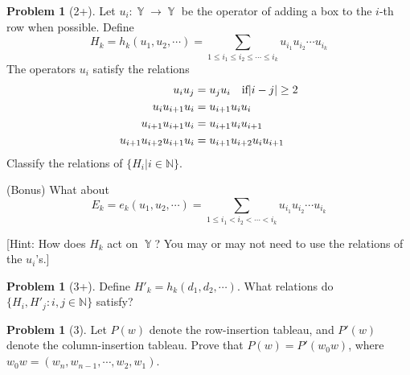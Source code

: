 \documentclass{amsart}
\theoremstyle{plain}
\theoremstyle{definition}
\newtheorem{problem}[theorem]{Problem}
\DeclareMathOperator{\YY}{\mathbb{Y}}
\begin{document}
\begin{problem}[2+]
	Let $u_i:\YY\to \YY$ be the operator of adding a box to the $i$-th row when possible. Define 
	\[H_k=h_k(u_1,u_2,\cdots)=\sum_{1\leq i_1\leq i_2\leq\cdots\leq i_k}u_{i_1}u_{i_2}\cdots u_{i_k}\]
	The operators $u_i$ satisfy the relations 
	\begin{align*}
	u_iu_j&=u_ju_i\text{\quad if}|i-j|\geq 2\\
	u_iu_{i+1}u_i&=u_{i+1}u_iu_i\\
	u_{i+1}u_{i+1}u_i&=u_{i+1}u_iu_{i+1}\\
	u_{i+1}u_{i+2}u_{i+1}u_i&=u_{i+1}u_{i+2}u_iu_{i+1}	
	\end{align*}
	Classify the relations of $\{H_i|i\in\mathbb{N}\}$.
	
	(Bonus) What about 
	$$E_k=e_k(u_1,u_2,\cdots)=\sum_{1\leq i_1<i_2<\cdots<i_k}u_{i_1}u_{i_2}\cdots u_{i_k}$$
	
	
[Hint: How does $H_k$ act on $\YY$? You may or may not need to use the relations of the $u_i$'s.] 
\end{problem}
\begin{problem}[3+]
	
	Define $H'_k=h_k(d_1,d_2,\cdots)$. What relations do $\{H_i,H'_j:i,j\in\mathbb{N}\}$ satisfy?
\end{problem}
\begin{problem}[3]
	Let $P(w)$ denote the row-insertion tableau, and $P'(w)$ denote the column-insertion tableau. Prove that $P(w)=P'(w_0w)$, where $w_0w=(w_n,w_{n-1},\cdots,w_2,w_1)$.
\end{problem}


	
\end{document}
